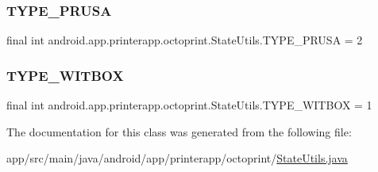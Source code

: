 \subsubsection{\texorpdfstring{T\+Y\+P\+E\+\_\+\+P\+R\+U\+SA}{TYPE\_PRUSA}}
{\footnotesize\ttfamily final int android.\+app.\+printerapp.\+octoprint.\+State\+Utils.\+T\+Y\+P\+E\+\_\+\+P\+R\+U\+SA = 2\hspace{0.3cm}{\ttfamily [static]}}

\mbox{\label{classandroid_1_1app_1_1printerapp_1_1octoprint_1_1_state_utils_a3dae28b569e7ae94fb9a60066d5afa10}} 
\subsubsection{\texorpdfstring{T\+Y\+P\+E\+\_\+\+W\+I\+T\+B\+OX}{TYPE\_WITBOX}}
{\footnotesize\ttfamily final int android.\+app.\+printerapp.\+octoprint.\+State\+Utils.\+T\+Y\+P\+E\+\_\+\+W\+I\+T\+B\+OX = 1\hspace{0.3cm}{\ttfamily [static]}}



The documentation for this class was generated from the following file\+:\begin{DoxyCompactItemize}
\item 
app/src/main/java/android/app/printerapp/octoprint/\hyperlink{_state_utils_8java}{State\+Utils.\+java}\end{DoxyCompactItemize}
